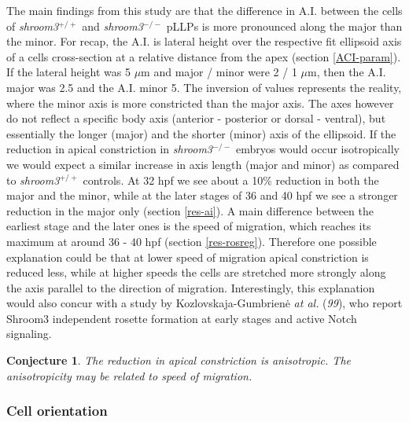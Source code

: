 \documentclass[10pt, b5paper, singlespacinge, twoside]{reedthesis} %
\newtheorem{conjecture}{Conjecture}[chapter]
\theoremstyle{definition}
\theoremstyle{definition}
\theoremstyle{definition}
\theoremstyle{remark}
\begin{document}
The main findings from this study are that the difference in A.I. between the cells of \emph{shroom3}\(^{+/+}\) and \emph{shroom3}\(^{-/-}\) pLLPs is more pronounced along the major than the minor. For recap, the A.I. is lateral height over the respective fit ellipsoid axis of a cells cross-section at a relative distance from the apex (section \ref{ACI-param}). If the lateral height was 5 \(\mu\)m and major / minor were 2 / 1 \(\mu\)m, then the A.I. major was 2.5 and the A.I. minor 5. The inversion of values represents the reality, where the minor axis is more constricted than the major axis. The axes however do not reflect a specific body axis (anterior - posterior or dorsal - ventral), but essentially the longer (major) and the shorter (minor) axis of the ellipsoid. If the reduction in apical constriction in \emph{shroom3}\(^{-/-}\) embryos would occur isotropically we would expect a similar increase in axis length (major and minor) as compared to \emph{shroom3}\(^{+/+}\) controls. At 32 hpf we see about a 10\(\%\) reduction in both the major and the minor, while at the later stages of 36 and 40 hpf we see a stronger reduction in the major only (section \ref{res-ai}). A main difference between the earliest stage and the later ones is the speed of migration, which reaches its maximum at around 36 - 40 hpf (section \ref{res-rosreg}). Therefore one possible explanation could be that at lower speed of migration apical constriction is reduced less, while at higher speeds the cells are stretched more strongly along the axis parallel to the direction of migration. Interestingly, this explanation would also concur with a study by Kozlovskaja-Gumbrienė \emph{at al.} (\emph{99}), who report Shroom3 independent rosette formation at early stages and active Notch signaling.
\begin{conjecture}
\protect\hypertarget{cnj:unnamed-chunk-15}{}{\label{cnj:unnamed-chunk-15} }The reduction in apical constriction is anisotropic. The anisotropicity may be related to speed of migration.
\end{conjecture}
\hypertarget{cell-orientation}{%
\subsubsection{Cell orientation}\label{cell-orientation}}
\end{document}
